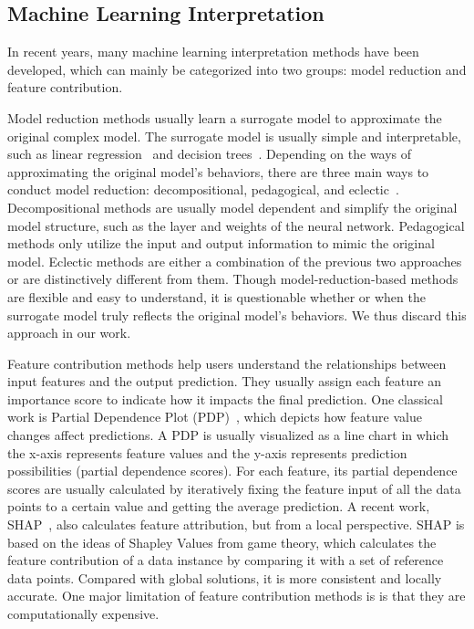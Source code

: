 \subsection{Machine Learning Interpretation}
\label{sec:mlinter}
In recent years, many machine learning interpretation methods have been developed, which can mainly be categorized into two groups: model reduction and feature contribution.

Model reduction methods usually learn a surrogate model to approximate the original complex model.
The surrogate model is usually simple and interpretable, such as linear regression~\cite{ribeiro2016should} and decision trees~\cite{craven1996extracting}. 
Depending on the ways of approximating the original model's behaviors, there are three main ways to conduct model reduction: decompositional, pedagogical, and eclectic~\cite{andrews1995survey}.
Decompositional methods are usually model dependent and simplify the original model structure, such as the layer and weights of the neural network.
Pedagogical methods only utilize the input and output information to mimic the original model.
Eclectic methods are either a combination of the previous two approaches or are distinctively different from them.
Though model-reduction-based methods are flexible and easy to understand, it is questionable whether or when the surrogate model truly reflects the original model's behaviors.
We thus discard this approach in our work.

Feature contribution methods help users understand the relationships between input features and the output prediction.
They usually assign each feature an importance score to indicate how it impacts the final prediction.
One classical work is Partial Dependence Plot (PDP)~\cite{friedman2001greedy}, which depicts how feature value changes affect predictions.
A PDP is usually visualized as a line \textbf{}chart in which the x-axis represents feature values and the y-axis represents prediction possibilities (partial dependence scores).
For each feature, its partial dependence scores are usually calculated by iteratively fixing the feature input of all the data points to a certain value and getting the average prediction.
A recent work, SHAP~\cite{lundberg2017unified}, also calculates feature attribution, but from a local perspective.
SHAP is based on the ideas of Shapley Values from game theory, which calculates the feature contribution of a data instance by comparing it with a set of reference data points.
Compared with global solutions, it is more consistent and locally accurate.
One major limitation of feature contribution methods is is that they are computationally expensive. 

